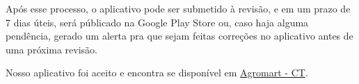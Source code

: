 Após esse processo, o aplicativo pode ser submetido à revisão, e em um prazo de 7 dias úteis, será públicado na Google Play Store ou, caso haja alguma pendência, gerado um alerta pra que sejam feitas correções no aplicativo antes de uma próxima revisão.

Nosso aplicativo foi aceito e encontra se disponível em  \href{https://play.google.com/store/apps/details?id=com.ct.agromart}{Agromart - CT}.

